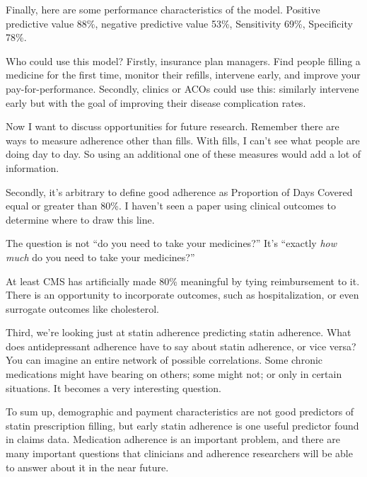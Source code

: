 \documentclass[12pt]{report}
\begin{document}
\begin{large}
Finally, here are some performance characteristics of the model.
Positive predictive value 88\%, negative predictive value 53\%,
Sensitivity 69\%, Specificity 78\%. %

Who could use this model? Firstly, insurance plan managers. Find
people filling a medicine for the first time, monitor their refills,
intervene early, and improve your pay-for-performance. Secondly,
clinics or ACOs could use this: similarly intervene early but with the
goal of improving their disease complication rates. %

Now I want to discuss opportunities for future research. Remember
there are ways to measure adherence other than fills. With fills, I
can't see what people are doing day to day. So using an additional one
of these measures would add a lot of information.

Secondly, it's arbitrary to define good adherence as Proportion of
Days Covered equal or greater than 80\%. I haven't seen a paper using
clinical outcomes to determine where to draw this line.

\end{large}

The question is not ``do you need to take your medicines?'' It's
``exactly \emph{how much} do you need to take your medicines?''

\begin{large}

At least CMS has artificially made 80\% meaningful by tying
reimbursement to it. There is an opportunity to incorporate outcomes,
such as hospitalization, or even surrogate outcomes like cholesterol.

Third, we're looking just at statin adherence predicting statin
adherence. What does antidepressant adherence have to say about statin
adherence, or vice versa? You can imagine an entire network of
possible correlations. Some chronic medications might have bearing on
others; some might not; or only in certain situations. It becomes a
very interesting question.

To sum up, demographic and payment characteristics are not good
predictors of statin prescription filling, but early statin adherence
is one useful predictor found in claims data. Medication adherence is
an important problem, and there are many important questions that
clinicians and adherence researchers will be able to answer about it
in the near future.

\end{large}
\end{document}
